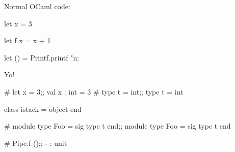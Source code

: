 Normal OCaml code:

\begin{ocaml}
let x = 3

let f x = x + 1

let () = Printf.printf "n: %
\end{ocaml}

Yo!

\begin{ocaml}
# let x = 3;;
val x : int = 3
# type t = int;;
type t = int
\end{ocaml}


\begin{ocaml}
class istack = object end
\end{ocaml}

\begin{ocaml}
# module type Foo = sig type t end;;
module type Foo = sig type t end
\end{ocaml}


\begin{ocaml}
# Pipe.f ();;
- : unit
\end{ocaml}
